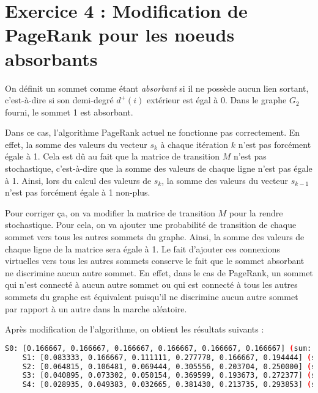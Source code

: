 \section{Exercice 4 : Modification de PageRank pour les noeuds absorbants}
On définit un sommet comme étant \textit{absorbant} si il ne possède aucun lien sortant, c'est-à-dire si son demi-degré $d^+(i)$ extérieur est égal à 0. Dans le graphe $G_2$ fourni, le sommet 1 est absorbant.

Dans ce cas, l'algorithme PageRank actuel ne fonctionne pas correctement. En effet, la somme des valeurs du vecteur $s_k$ à chaque itération $k$ n'est pas forcément égale à 1. Cela est dû au fait que la matrice de transition $M$ n'est pas stochastique, c'est-à-dire que la somme des valeurs de chaque ligne n'est pas égale à 1. Ainsi, lors du calcul des valeurs de $s_k$, la somme des valeurs du vecteur $s_{k-1}$ n'est pas forcément égale à 1 non-plus.

Pour corriger ça, on va modifier la matrice de transition $M$ pour la rendre stochastique. Pour cela, on va ajouter une probabilité de transition de chaque sommet vers tous les autres sommets du graphe. Ainsi, la somme des valeurs de chaque ligne de la matrice sera égale à 1. Le fait d'ajouter ces connexions virtuelles vers tous les autres sommets conserve le fait que le sommet absorbant ne discrimine aucun autre sommet. En effet, dans le cas de PageRank, un sommet qui n'est connecté à aucun autre sommet ou qui est connecté à tous les autres sommets du graphe est équivalent puisqu'il ne discrimine aucun autre sommet par rapport à un autre dans la marche aléatoire.

Après modification de l'algorithme, on obtient les résultats suivants :

\begin{minipage}{\dimexpr\linewidth-20pt}
    \begin{lstlisting}[language=bash, caption={Résultat de l'algorithme PageRank sur le graphe $G_2$ fourni, pour $k = 4$, avec la somme des valeurs du vecteur $s_k$ à chaque itération $k$.}]
    S0: [0.166667, 0.166667, 0.166667, 0.166667, 0.166667, 0.166667] (sum: 1.000000)
    S1: [0.083333, 0.166667, 0.111111, 0.277778, 0.166667, 0.194444] (sum: 1.000000)
    S2: [0.064815, 0.106481, 0.069444, 0.305556, 0.203704, 0.250000] (sum: 1.000000)
    S3: [0.040895, 0.073302, 0.050154, 0.369599, 0.193673, 0.272377] (sum: 1.000000)
    S4: [0.028935, 0.049383, 0.032665, 0.381430, 0.213735, 0.293853] (sum: 1.000000)
    \end{lstlisting}
\end{minipage}

